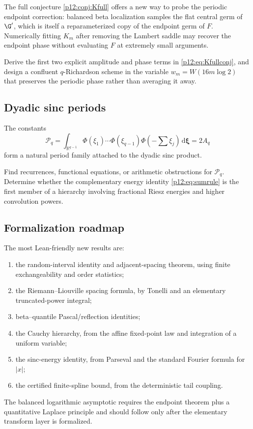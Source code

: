 \documentclass[11pt,oneside]{article}
\theoremstyle{definition}
\theoremstyle{remark}
\newcommand{\F}{F}
\newcommand{\R}{\mathbb R}
\newcommand{\dd}{\,\mathrm d}
\newcommand{\1}{\mathbf 1}
\begin{document}
The full conjecture \cref{p12:conj:Kfull} offers a new way to probe the periodic
endpoint correction: balanced beta localization samples the flat central germ
of \(\G'\), which is itself a reparameterized copy of the endpoint germ of
\(\F\).  Numerically fitting \(K_m\) after removing the Lambert saddle may
recover the endpoint phase without evaluating \(\F\) at extremely small
arguments.

\begin{problem}
Derive the first two explicit amplitude and phase terms in
\eqref{p12:eq:Kfullconj}, and design a confluent \(q\)-Richardson scheme in the
variable \(w_m=W(16m\log2)\) that preserves the periodic phase rather than
averaging it away.
\end{problem}

\subsection{Dyadic sinc periods}

The constants
\begin{equation}
 \mathcal P_q=\int_{\R^{q-1}}
 \Phi(\xi_1)\cdots\Phi(\xi_{q-1})
 \Phi\!\left(-\sum\xi_j\right)\dd\bm\xi=2A_q
\end{equation}
form a natural period family attached to the dyadic sinc product.

\begin{problem}
Find recurrences, functional equations, or arithmetic obstructions for
\(\mathcal P_q\).  Determine whether the complementary energy identity
\eqref{p12:eq:sumrule} is the first member of a hierarchy involving fractional
Riesz energies and higher convolution powers.
\end{problem}

\subsection{Formalization roadmap}

The most Lean-friendly new results are:
\begin{enumerate}
 \item the random-interval identity and adjacent-spacing theorem, using finite
       exchangeability and order statistics;
 \item the Riemann--Liouville spacing formula, by Tonelli and an elementary
       truncated-power integral;
 \item beta--quantile Pascal/reflection identities;
 \item the Cauchy hierarchy, from the affine fixed-point law and integration of
       a uniform variable;
 \item the sinc-energy identity, from Parseval and the standard Fourier formula
       for \(|x|\);
 \item the certified finite-spline bound, from the deterministic tail coupling.
\end{enumerate}
The balanced logarithmic asymptotic requires the endpoint theorem plus a
quantitative Laplace principle and should follow only after the elementary
transform layer is formalized.
\end{document}
